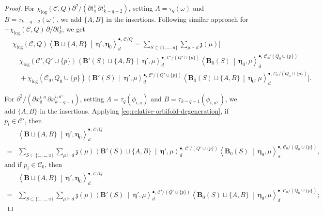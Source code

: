 \documentclass[10pt,a4paper]{amsart}
\newcommand{\cC}{\mathcal C}
\begin{document}
\begin{proof}
For
\(\chi_{\log}(\cC,Q)\partial^2/(\partial t^1_q\,\partial t^1_{k-q-2})\),
setting \(A=\tau_q(\omega)\) and \(B=\tau_{k-q-2}(\omega)\), we add \(\{A,B\}\) in the insertions.
Following similar approach for \(-\chi_{\log}(\cC,Q)\,\partial/\partial t^1_k\), we get
\[
\begin{aligned}
&\chi_{\log}(\cC,Q)
 \left\langle\mathbf B\sqcup\{A,B\}
 \ \middle|\ \boldsymbol\eta',\boldsymbol\eta_0\right\rangle_d^{\bullet,\,\cC/Q}
={}\sum_{S\subset\{1,\ldots,u\}}\sum_{\mu\vdash d}\mathfrak z(\mu)\Bigg[
\\[-2mm]
&\quad\chi_{\log}(\cC',Q'\cup\{p\})
 \left\langle\mathbf B'(S)\sqcup\{A,B\}
 \,\middle|\,\boldsymbol\eta',\mu\right\rangle_d^{\bullet,\,\cC'/(Q'\cup\{p\})}
 \left\langle\mathbf B_0(S)\,\middle|\,\boldsymbol\eta_0,\mu\right\rangle_d^{\bullet,\,\cC_0/(Q_0\cup\{p\})}
\\[-1mm]
&\quad+\chi_{\log}(\cC_0,Q_0\cup\{p\})
 \left\langle\mathbf B'(S)\,\middle|\,\boldsymbol\eta',\mu\right\rangle_d^{\bullet,\,\cC'/(Q'\cup\{p\})}
 \left\langle\mathbf B_0(S)\sqcup\{A,B\}
 \,\middle|\,\boldsymbol\eta_0,\mu\right\rangle_d^{\bullet,\,\cC_0/(Q_0\cup\{p\})}\Bigg].
\end{aligned}
\]


For
\(\partial^2/(\partial x^{i,a}_q\,\partial x^{i,a^\vee}_{k-q-1})\), setting
\(A=\tau_q(\phi_{i,a})\) and
\(B=\tau_{k-q-1}(\phi_{i,a^\vee})\),  we add \(\{A,B\}\) in the insertions. Applying \eqref{eq:relative-orbifold-degeneration}, if \(p_i\in\cC'\), then
\[
\begin{aligned}
&\left\langle\mathbf B\sqcup\{A,B\}
 \ \middle|\ \boldsymbol\eta',\boldsymbol\eta_0\right\rangle_d^{\bullet,\,\cC/Q}
\\
={}&\sum_{S\subset\{1,\ldots,u\}}\sum_{\mu\vdash d}\mathfrak z(\mu)
 \left\langle\mathbf B'(S)\sqcup\{A,B\}
 \ \middle|\ \boldsymbol\eta',\mu\right\rangle_d^{\bullet,\,\cC'/(Q'\cup\{p\})}
 \left\langle\mathbf B_0(S)\ \middle|\ \boldsymbol\eta_0,\mu\right\rangle_d^{\bullet,\,\cC_0/(Q_0\cup\{p\})},
\end{aligned}
\]
and if \(p_i\in\cC_0\), then
\[
\begin{aligned}
&\left\langle\mathbf B\sqcup\{A,B\}
 \ \middle|\ \boldsymbol\eta',\boldsymbol\eta_0\right\rangle_d^{\bullet,\,\cC/Q}
\\
={}&\sum_{S\subset\{1,\ldots,u\}}\sum_{\mu\vdash d}\mathfrak z(\mu)
 \left\langle\mathbf B'(S)
 \ \middle|\ \boldsymbol\eta',\mu\right\rangle_d^{\bullet,\,\cC'/(Q'\cup\{p\})}
 \left\langle\mathbf B_0(S)\sqcup\{A,B\}\ \middle|\ \boldsymbol\eta_0,\mu\right\rangle_d^{\bullet,\,\cC_0/(Q_0\cup\{p\})};
\end{aligned}
\]


\end{proof}
\end{document}
